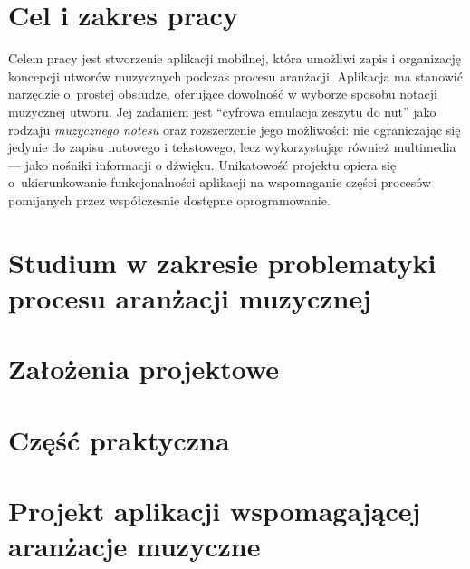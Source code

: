 \documentclass[12pt]{article}
\begin{document}
\newpage
{}
\section*{Cel i zakres pracy}
Celem pracy jest stworzenie aplikacji mobilnej, która umożliwi zapis i organizację koncepcji utworów muzycznych podczas procesu aranżacji.
Aplikacja ma stanowić narzędzie o~prostej obsłudze, oferujące dowolność w wyborze sposobu notacji muzycznej utworu.
Jej zadaniem jest \enquote{cyfrowa emulacja zeszytu do nut} jako rodzaju \textit{muzycznego notesu} oraz rozszerzenie jego możliwości: nie
ograniczając się jedynie do zapisu nutowego i tekstowego, lecz wykorzystując również multimedia — jako nośniki informacji o dźwięku.
Unikatowość projektu opiera się o~ukierunkowanie funkcjonalności aplikacji na wspomaganie części procesów pomijanych przez współczesnie
dostępne oprogramowanie.

\newpage
\section{Studium w zakresie problematyki procesu aranżacji muzycznej}


\newpage
\section{Założenia projektowe}


\newpage
{}
\section*{Część praktyczna}
\section{Projekt aplikacji wspomagającej aranżacje muzyczne}


\newpage
\end{document}
